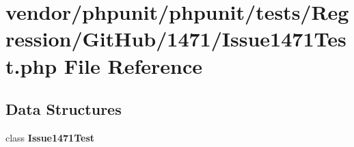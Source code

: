 \section{vendor/phpunit/phpunit/tests/\+Regression/\+Git\+Hub/1471/\+Issue1471\+Test.php File Reference}
\label{_issue1471_test_8php}
\subsection*{Data Structures}
\begin{DoxyCompactItemize}
\item 
class {\bf Issue1471\+Test}
\end{DoxyCompactItemize}
